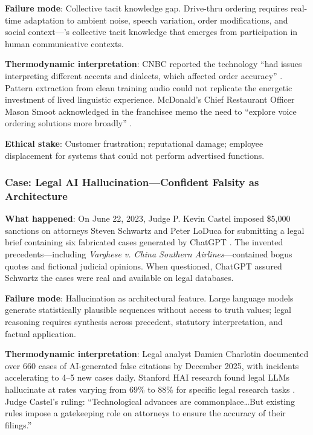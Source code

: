 \textbf{Failure mode}: Collective tacit knowledge gap. Drive-thru ordering requires real-time adaptation to ambient noise, speech variation, order modifications, and social context---\citet{collins2010}'s collective tacit knowledge that emerges from participation in human communicative contexts.

\textbf{Thermodynamic interpretation}: CNBC reported the technology ``had issues interpreting different accents and dialects, which affected order accuracy'' \citep{cnbc2024mcdonalds}. Pattern extraction from clean training audio could not replicate the energetic investment of lived linguistic experience. McDonald's Chief Restaurant Officer Mason Smoot acknowledged in the franchisee memo the need to ``explore voice ordering solutions more broadly'' \citep{restaurantbusiness2024}.

\textbf{Ethical stake}: Customer frustration; reputational damage; employee displacement for systems that could not perform advertised functions.

\subsubsection{Case: Legal AI Hallucination---Confident Falsity as Architecture}

\textbf{What happened}: On June 22, 2023, Judge P. Kevin Castel imposed \$5,000 sanctions on attorneys Steven Schwartz and Peter LoDuca for submitting a legal brief containing six fabricated cases generated by ChatGPT \citep{fortune2023chatgpt}. The invented precedents---including \textit{Varghese v. China Southern Airlines}---contained bogus quotes and fictional judicial opinions. When questioned, ChatGPT assured Schwartz the cases were real and available on legal databases.

\textbf{Failure mode}: Hallucination as architectural feature. Large language models generate statistically plausible sequences without access to truth values; legal reasoning requires synthesis across precedent, statutory interpretation, and factual application.

\textbf{Thermodynamic interpretation}: Legal analyst Damien Charlotin documented over 660 cases of AI-generated false citations by December 2025, with incidents accelerating to 4--5 new cases daily. Stanford HAI research found legal LLMs hallucinate at rates varying from 69\% to 88\% for specific legal research tasks \citep{stanfordhai2024}. Judge Castel's ruling: ``Technological advances are commonplace\ldots But existing rules impose a gatekeeping role on attorneys to ensure the accuracy of their filings.''

